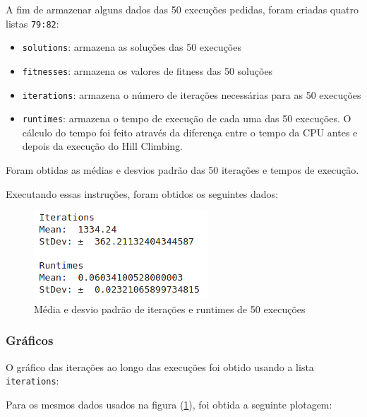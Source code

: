 A fim de armazenar alguns dados das 50 execuções pedidas, foram criadas quatro listas \verb*|79:82|:
\begin{itemize}
	\item \verb*|solutions|: armazena as soluções das 50 execuções
	\item \verb*|fitnesses|: armazena os valores de fitness das 50 soluções
	\item \verb*|iterations|: armazena o número de iterações necessárias para as 50 execuções
	\item \verb*|runtimes|: armazena o tempo de execução de cada uma das 50 execuções. O cálculo do tempo foi feito através da diferença entre o tempo da CPU antes e depois da execução do Hill Climbing.
\end{itemize}



Foram obtidas as médias e desvios padrão das 50 iterações e tempos de execução.



Executando essas instruções, foram obtidos os seguintes dados:

\begin{figure}[H]
	\centering
	\includegraphics[scale=.7]{img/stats_hill}
	\caption{Média e desvio padrão de iterações e runtimes de 50 execuções}
	\label{statshill}
\end{figure}

\subsubsection{Gráficos}

O gráfico das iterações ao longo das execuções foi obtido usando a lista \verb*|iterations|:



Para os mesmos dados usados na figura (\ref{statshill}), foi obtida a seguinte plotagem:


